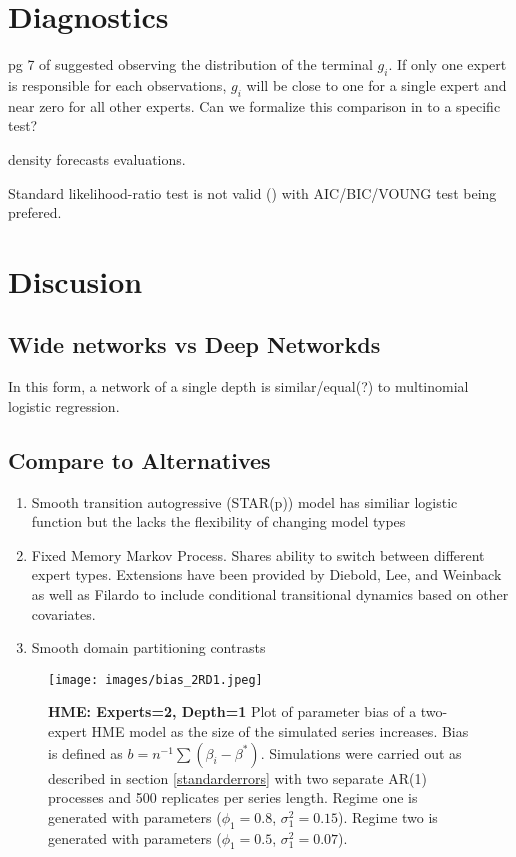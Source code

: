 \documentclass[12pt]{article}
\begin{document}
\section{Diagnostics}
pg 7 of \cite{WMS1995} suggested observing the distribution of the terminal
$g_{i}$. If only one expert is responsible for each observations, $g_{i}$ will
be close to one for a single expert and near zero for all other experts.
Can we formalize this comparison in to a specific test?

density forecasts evaluations.

Standard likelihood-ratio test is not valid (\cite{CarvalhoTanner2006}) with
AIC/BIC/VOUNG test being prefered.


  
\section{Discusion}
\subsection{Wide networks vs Deep Networkds}
In this form, a network of a single depth is similar/equal(?) to multinomial logistic regression.
\subsection{Compare to Alternatives}
\begin{enumerate}
\item Smooth transition autogressive (STAR(p)) model has similiar logistic function but the lacks the flexibility of changing model types
\item Fixed Memory Markov Process. Shares ability to switch between different expert types. Extensions have been provided by Diebold, Lee, and Weinback \cite{DieboldLeeWeinbach1994} as well as Filardo \cite{Filardo1994} to include conditional transitional dynamics based on other covariates.
\item Smooth domain partitioning contrasts
\end{enumerate}
\begin{figure}[ht]
  \centering
  \texttt{[image: images/bias\_2RD1.jpeg]}
  \caption{\textbf{HME: Experts=2, Depth=1} Plot of parameter bias of a two-expert HME model as the size of the simulated series increases. Bias is defined as $b=n^{-1}\textstyle{\sum}(\beta_{i}-\beta^{*})$. Simulations were carried out as described in section \ref{standarderrors} with two separate AR(1) processes and 500 replicates per series length. Regime one is generated with parameters ($\phi_{1}=0.8$, $\sigma^{2}_{1}=0.15$). Regime two is generated with parameters ($\phi_{1}=0.5$, $\sigma^{2}_{1}=0.07$).}
  \label{fig:bias_2RD1}
\end{figure}
\end{document}
